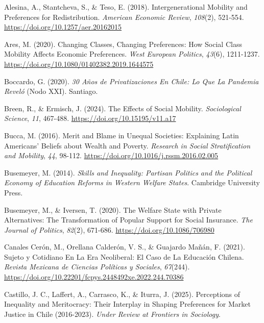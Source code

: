 \documentclass[
  spanish,
  letterpaper,
  DIV=11,
  numbers=noendperiod,
  oneside]{scrartcl}
\newlength{\cslhangindent}
\newenvironment{CSLReferences}[2] %
 {\begin{list}{}{%
  \setlength{\itemindent}{0pt}
  \setlength{\leftmargin}{0pt}
  \setlength{\parsep}{0pt}
  \ifodd #1
   \setlength{\leftmargin}{\cslhangindent}
   \setlength{\itemindent}{-1\cslhangindent}
  \fi
  \setlength{\itemsep}{#2\baselineskip}}}
 {\end{list}}
\begin{document}
\label{refs}
\begin{CSLReferences}{1}{0}
Alesina, A., Stantcheva, S., \& Teso, E. (2018). Intergenerational
{Mobility} and {Preferences} for {Redistribution}. \emph{American
Economic Review}, \emph{108}(2), 521-554.
\url{https://doi.org/10.1257/aer.20162015}

Ares, M. (2020). Changing Classes, Changing Preferences: How Social
Class Mobility Affects Economic Preferences. \emph{West European
Politics}, \emph{43}(6), 1211-1237.
\url{https://doi.org/10.1080/01402382.2019.1644575}

Boccardo, G. (2020). \emph{30 A{ñ}os de Privatizaciones En {Chile}: Lo
Que La Pandemia Revel{ó}} (Nodo XXI). Santiago.

Breen, R., \& Ermisch, J. (2024). The {Effects} of {Social Mobility}.
\emph{Sociological Science}, \emph{11}, 467-488.
\url{https://doi.org/10.15195/v11.a17}

Bucca, M. (2016). Merit and Blame in Unequal Societies: {Explaining
Latin Americans}' Beliefs about Wealth and Poverty. \emph{Research in
Social Stratification and Mobility}, \emph{44}, 98-112.
\url{https://doi.org/10.1016/j.rssm.2016.02.005}

Busemeyer, M. (2014). \emph{Skills and {Inequality}: {Partisan Politics}
and the {Political Economy} of {Education Reforms} in {Western Welfare
States}}. Cambridge University Press.

Busemeyer, M., \& Iversen, T. (2020). The {Welfare State} with {Private
Alternatives}: {The Transformation} of {Popular Support} for {Social
Insurance}. \emph{The Journal of Politics}, \emph{82}(2), 671-686.
\url{https://doi.org/10.1086/706980}

Canales Cerón, M., Orellana Calderón, V. S., \& Guajardo Mañán, F.
(2021). Sujeto y Cotidiano En La Era Neoliberal: El Caso de La
Educaci{ó}n Chilena. \emph{Revista Mexicana de Ciencias Pol{í}ticas y
Sociales}, \emph{67}(244).
\url{https://doi.org/10.22201/fcpys.2448492xe.2022.244.70386}

Castillo, J. C., Laffert, A., Carrasco, K., \& Iturra, J. (2025).
Perceptions of {Inequality} and {Meritocracy}: {Their Interplay} in
{Shaping Preferences} for {Market Justice} in {Chile} (2016-2023).
\emph{Under Review at Frontiers in Sociology}.


\end{CSLReferences}
\end{document}
